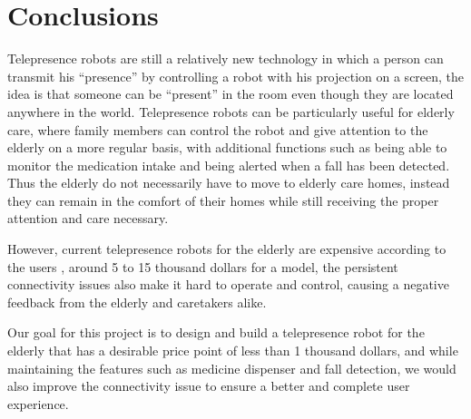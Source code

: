 \documentclass[12pt]{article}
\newcommand{\gadd}[1]{{\color{gray} #1}}
\begin{document}
\section{Conclusions}
\gadd{
Telepresence robots are still a relatively new technology in which a person can transmit his “presence” by controlling a robot with his projection on a screen, the idea is that someone can be “present” in the room even though they are located anywhere in the world. Telepresence robots can be particularly useful for elderly care, where family members can control the robot and give attention to the elderly on a more regular basis, with additional functions such as being able to monitor the medication intake and being alerted when a fall has been detected. Thus the elderly do not necessarily have to move to elderly care homes, instead they can remain in the comfort of their homes while still receiving the proper attention and care necessary.\par
However, current telepresence robots for the elderly are expensive according to the users\cite{6} , around 5 to 15 thousand dollars for a model, the persistent connectivity issues also make it hard to operate and control, causing a negative feedback from the elderly and caretakers alike\cite{7}.\par
Our goal for this project is to design and build a telepresence robot for the elderly that has a desirable price point of less than 1 thousand dollars, and while maintaining the features such as medicine dispenser and fall detection, we would also improve the connectivity issue to ensure a better and complete user experience.}
\newpage
\end{document}
